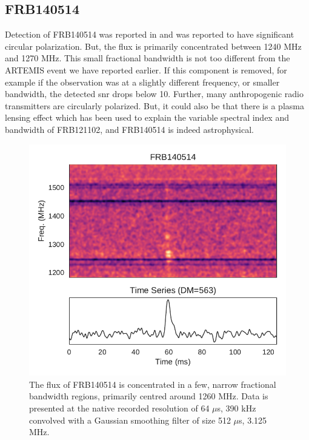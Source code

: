 \documentclass[a4paper,fleqn,usenatbib]{mnras}
\begin{document}
\subsection{FRB140514}

Detection of FRB140514 was reported in \citep{2015MNRAS.447..246P} and was
reported to have significant circular polarization. But, the flux is primarily
concentrated between 1240 MHz and 1270 MHz. This small fractional bandwidth is
not too different from the ARTEMIS event we have reported earlier.  If this
component is removed, for example if the observation was at a slightly different
frequency, or smaller bandwidth, the detected \gls{snr} drops below 10.
Further, many anthropogenic radio transmitters are circularly polarized. But,
it could also be that there is a plasma lensing effect
\citep{2017ApJ...842...35C} which has been used to explain the variable spectral
index and bandwidth of FRB121102, and FRB140514 is indeed astrophysical.

\begin{figure}
    \includegraphics[width=1.0\linewidth]{figures/FRB140514.pdf}
    \caption{The flux of FRB140514 is concentrated in a few, narrow fractional
    bandwidth regions, primarily centred around 1260 MHz.  Data is presented at
    the native recorded resolution of 64 $\mu$s, 390 kHz convolved with a
    Gaussian smoothing filter of size 512 $\mu$s, 3.125 MHz.
    }
    \label{fig:FRB140514}
\end{figure}
\end{document}
